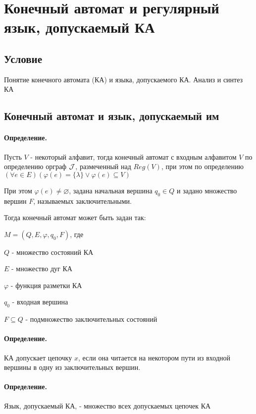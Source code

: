 \documentclass{report}
\begin{document}
\newpage

\section{Конечный автомат и регулярный язык, допускаемый КА}
\subsection{Условие}
Понятие конечного автомата (КА) и языка, допускаемого КА. Анализ и синтез КА

\subsection{Конечный автомат и язык, допускаемый им}
\paragraph*{Определение.}
Пусть $V$ - некоторый алфавит, тогда конечный автомат с входным алфавитом  $V$ по
определению орграф  $ {\cal J}$, размеченный над $Reg(V)$, при этом по определению
 $(\forall e \in E)(\varphi(e)=\{\lambda\}  \lor \varphi(e) \subseteq V )$ 

 При этом $\varphi(e) \neq \varnothing$, задана начальная вершина $q_0 \in Q$ и задано множество
 вершин $F$, называемых заключительными.

 Тогда конечный автомат может быть задан так:

  $M = (Q,E,\varphi,q_0,F)$, где

  $Q$ - множество состояний КА

  $E$ - множество дуг КА

   $\varphi$ - функция разметки КА

  $q_0$ - входная вершина
 
  $F \subseteq Q$ - подмножество заключительных состояний

\paragraph*{Определение.}
КА допускает цепочку $x$, если она читается на некотором пути из входной вершины в одну
из заключительных вершин.

 \paragraph*{Определение.}
Язык, допускаемый КА, - множество всех допускаемых цепочек КА
\end{document}
